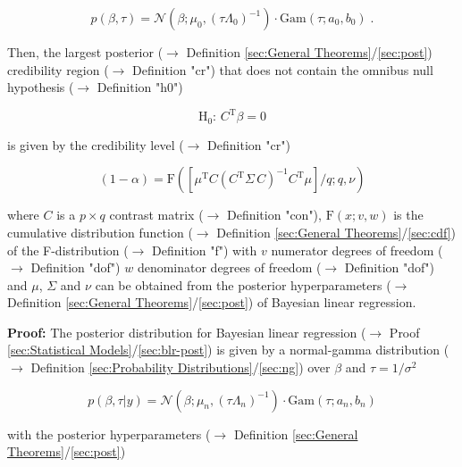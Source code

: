 \documentclass[a4paper,12pt,twoside]{book}
\begin{document}
\begin{equation} \label{eq:blr-pcr-GLM-NG-prior}
p(\beta,\tau) = \mathcal{N}(\beta; \mu_0, (\tau \Lambda_0)^{-1}) \cdot \mathrm{Gam}(\tau; a_0, b_0) \; .
\end{equation}

Then, the largest posterior ($\rightarrow$ Definition \ref{sec:General Theorems}/\ref{sec:post}) credibility region ($\rightarrow$ Definition "cr") that does not contain the omnibus null hypothesis ($\rightarrow$ Definition "h0")

\begin{equation} \label{eq:blr-pcr-GLM-H0}
\mathrm{H}_0: \, C^\mathrm{T} \beta = 0
\end{equation}

is given by the credibility level ($\rightarrow$ Definition "cr")

\begin{equation} \label{eq:blr-pcr-GLM-NG-PCR}
(1-\alpha) = \mathrm{F}\left( \left[ \mu^\mathrm{T} C (C^\mathrm{T} \Sigma \, C)^{-1} C^\mathrm{T} \mu \right]/q; q, \nu \right)
\end{equation}

where $C$ is a $p \times q$ contrast matrix ($\rightarrow$ Definition "con"), $\mathrm{F}(x; v, w)$ is the cumulative distribution function ($\rightarrow$ Definition \ref{sec:General Theorems}/\ref{sec:cdf}) of the F-distribution ($\rightarrow$ Definition "f") with $v$ numerator degrees of freedom ($\rightarrow$ Definition "dof") $w$ denominator degrees of freedom ($\rightarrow$ Definition "dof") and $\mu$, $\Sigma$ and $\nu$ can be obtained from the posterior hyperparameters ($\rightarrow$ Definition \ref{sec:General Theorems}/\ref{sec:post}) of Bayesian linear regression.


\vspace{1em}
\textbf{Proof:} The posterior distribution for Bayesian linear regression ($\rightarrow$ Proof \ref{sec:Statistical Models}/\ref{sec:blr-post}) is given by a normal-gamma distribution ($\rightarrow$ Definition \ref{sec:Probability Distributions}/\ref{sec:ng}) over $\beta$ and $\tau = 1/\sigma^2$

\begin{equation} \label{eq:blr-pcr-GLM-NG-post}
p(\beta,\tau|y) = \mathcal{N}(\beta; \mu_n, (\tau \Lambda_n)^{-1}) \cdot \mathrm{Gam}(\tau; a_n, b_n)
\end{equation}

with the posterior hyperparameters ($\rightarrow$ Definition \ref{sec:General Theorems}/\ref{sec:post})
\end{document}
